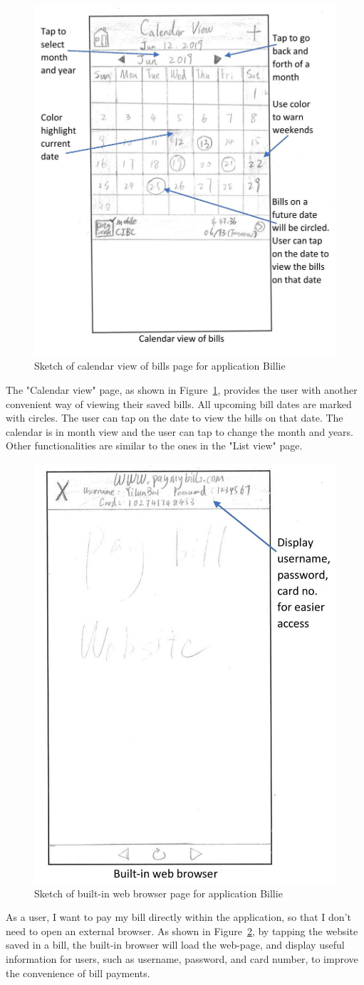 \documentclass{sigchi}
\begin{document}
\begin{figure}[h!]
\centering
  \includegraphics[width=0.6\columnwidth]{11-calendar-view-page.jpg}
  \caption{Sketch of calendar view of bills page for application Billie}
  \label{fig:figure26}
\end{figure}
The "Calendar view" page, as shown in Figure~\ref{fig:figure26}, provides the user with another convenient way of viewing their saved bills. All upcoming bill dates are marked with circles. The user can tap on the date to view the bills on that date. The calendar is in month view and the user can tap to change the month and years. Other functionalities are similar to the ones in the "List view" page. 


\begin{figure}[h!]
\centering
  \includegraphics[width=0.6\columnwidth]{12-web-browser-page.jpg}
  \caption{Sketch of built-in web browser page for application Billie}
  \label{fig:figure27}
\end{figure}
As a user, I want to pay my bill directly within the application, so that I don't need to open an external browser. As shown in Figure~\ref{fig:figure27}, by tapping the website saved in a bill, the built-in browser will load the web-page, and display useful information for users, such as username, password, and card number, to improve the convenience of bill payments.
\end{document}
